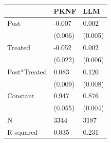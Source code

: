 \begin{tabular}{lll}
\toprule
 & PKNF & LLM \\
\midrule
Post & -0.007 & 0.002 \\
 & (0.006) & (0.005) \\
Treated & -0.052 & 0.002 \\
 & (0.022) & (0.006) \\
Post*Treated & 0.083 & 0.120 \\
 & (0.009) & (0.008) \\
Constant & 0.947 & 0.876 \\
 & (0.055) & (0.004) \\
N & 3344 & 3187 \\
R-squared & 0.035 & 0.231 \\
\bottomrule
\end{tabular}
